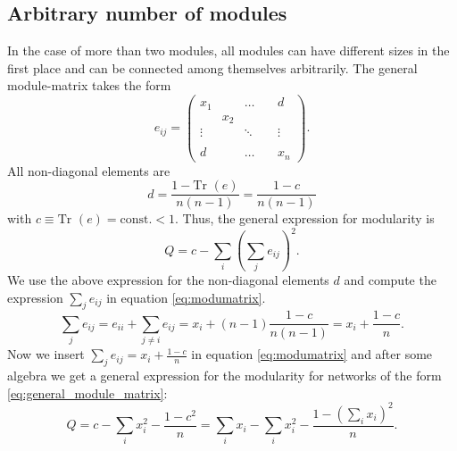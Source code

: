 \subsection{Arbitrary number of modules}
In the case of more than two modules, all modules can have different sizes in the first place and can be connected among themselves arbitrarily.
The general module-matrix takes the form
\begin{equation}\label{eq:general_module_matrix}
e_{ij}=\left(\begin{array}{ccccc}x_1 &  & \hdots &  & d \\ & x_2 &  &  &  \\\vdots &  & \ddots &  & \vdots \\ &  &  & \ &  \\d &  & \hdots &  & x_n\end{array}\right) .
\end{equation}
All non-diagonal elements are 
\[
d= \frac{1-\text{Tr } (e) }{n(n-1) } = \frac{1-c }{n(n-1) }
\]
with $c\equiv \text{Tr } (e)=\text{const.}<1$.
Thus, the general expression for modularity is
\begin{equation} \label{eq:modumatrix}
Q= c-\sum  _i \left( \sum _j e_{ij} \right)^2 .
\end{equation}
%
We use the above expression for the non-diagonal elements $d$ and compute the expression $\sum _j e_{ij}$ in equation \eqref{eq:modumatrix}.
\begin{equation}\label{eq:sumeij}
\sum _j e_{ij} = e_{ii} + \sum _{j\neq i} e_{ij} = x_i + (n-1) \frac{1-c}{n(n-1)} = x_i + \frac{1-c}{n}.
\end{equation}
%
Now we insert $\sum _j e_{ij}=x_i+\frac{1-c}{n}$ in equation \eqref{eq:modumatrix} and after some algebra we get a general expression for the modularity for networks of the form \eqref{eq:general_module_matrix}:
\begin{equation}\label{eq:Qndim}
Q=c-\sum _i x_i^2 - \frac{1-c^2}{n} = \sum _i x_i -\sum _i x_i^2 - \frac{1-(\sum _i x_i)^2}{n}.
\end{equation}

